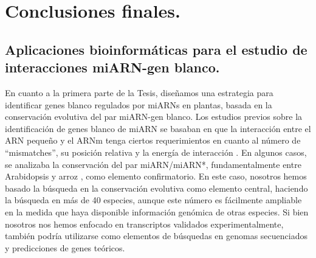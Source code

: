 \setcounter{chapter}{8}
\chapter*{Conclusiones finales.} 
\setcounter{figure}{0}
\setcounter{table}{0}
\setcounter{section}{0}


\graphicspath{{Chapter2/Figs/}}


\section{Aplicaciones bioinformáticas para el estudio de interacciones miARN-gen blanco.}

En cuanto a la primera parte de la Tesis, diseñamos una estrategia para identificar genes blanco regulados por miARNs en plantas, basada en la conservación evolutiva del par miARN-gen blanco.
Los estudios previos sobre la identificación de genes blanco de miARN se basaban en que la interacción entre el ARN pequeño y el ARNm tenga ciertos requerimientos en cuanto al número de ``mismatches'', su posición relativa y la energía de interacción \citep{pmid19167326,pmid12869753,pmid12242443}.
En algunos casos, se analizaba la conservación del par miARN/miARN*, fundamentalmente entre Arabidopsis y arroz \citep{15345049}, como elemento confirmatorio.
En este caso, nosotros hemos basado la búsqueda en la conservación evolutiva como elemento central, haciendo la búsqueda en más de 40 especies, aunque este número es fácilmente ampliable en la medida que haya disponible información genómica de otras especies.
Si bien nosotros nos hemos enfocado en transcriptos validados experimentalmente, también podría utilizarse como elementos de búsquedas en genomas secuenciados y predicciones de genes teóricos.

